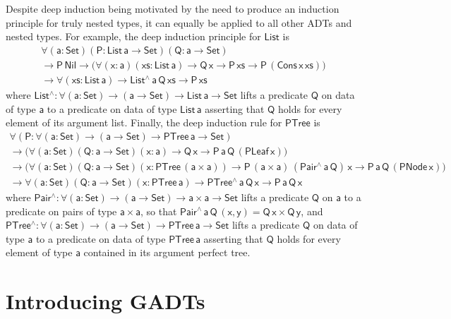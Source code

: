 \documentclass[acmsmall,screen,review,anonymous]{acmart}
\theoremstyle{definition}
\begin{document}
Despite deep induction being motivated by the need to produce an induction principle for truly nested types,
it can equally be applied to all other ADTs and nested types.
For example, the deep induction principle for $\mathsf{List}$ is
\begin{multline}
\mathsf{\forall (a : Set) (P : List\, a \to Set) (Q : a \to Set)} \\
\mathsf{\to P\,Nil \to \big( \forall (x : a) (xs: List\,a) \to Q\,x \to P\,xs \to P\,(Cons\,x\,xs)\big)} \\
\mathsf{\to \forall (xs : List\,a) \to List^{\wedge}\,a\,Q\,xs \to P\, xs }
\end{multline}
where $\mathsf{List^{\wedge} : \forall (a : Set) \to (a \to Set) \to List\,a \to Set}$ lifts a predicate $\mathsf{Q}$ on data of type $\mathsf{a}$ to a predicate on data of type $\mathsf{List\,a}$ asserting that $\mathsf{Q}$ holds for every element of its argument list.
Finally, the deep induction rule for $\mathsf{PTree}$ is
\begin{multline}
\mathsf{\forall (P : \forall (a : Set) \to (a \to Set) \to PTree\, a \to Set)} \\
\mathsf{\to \big( \forall (a : Set) (Q : a \to Set) (x : a) \to Q\,x \to P\,a\,Q\,(PLeaf\, x) \big)} \\
\mathsf{\to \big( \forall (a : Set) (Q : a \to Set) (x : PTree\,(a \times a)) \to P\,(a \times a)\,(Pair^{\wedge}\,a\,Q)\,x \to P\,a\,Q\,(PNode\,x)\big)} \\
\mathsf{\to \forall (a : Set) (Q : a \to Set) (x : PTree\,a) \to PTree^{\wedge}\,a\,Q\,x \to P\,a\,Q\,x }
\end{multline}
where $\mathsf{Pair^{\wedge} : \forall (a : Set) \to (a \to Set) \to a \times a \to Set}$ lifts a predicate $\mathsf{Q}$ on $\mathsf{a}$ to a predicate on pairs of type $\mathsf{a \times a}$,
so that $\mathsf{Pair^{\wedge}\,a\,Q\,(x,y) = Q\,x \times Q\,y}$,
and $\mathsf{PTree^{\wedge} : \forall (a : Set) \to (a \to Set) \to PTree\,a \to Set}$ lifts a predicate $\mathsf{Q}$ on data of type $\mathsf{a}$ to a predicate on data of type $\mathsf{PTree\,a}$ asserting that $\mathsf{Q}$ holds for every element of type $\mathsf{a}$ contained in its argument perfect tree.



\section{Introducing GADTs}
\end{document}
